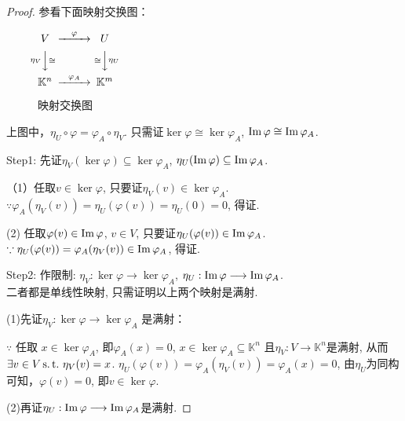 \begin{proof}
  参看下面映射交换图：%
  \begin{figure}[!ht]\centering
      $\begin{CD}
      V @>{\varphi}>> U \\
      @V{\eta_V}V{\cong}V @V{\cong}V{\eta_U}V\\
      \mathbb{K}^n @>{\varphi_A} >> \mathbb{K}^m
    \end{CD}$
    \caption{映射交换图\label{fig:ImKer1}}
  \end{figure}    
  上图中，$\eta_U\circ\varphi = \varphi_A\circ\eta_V$.
  只需证$ \ker\varphi \cong \ker\varphi_A$, $ \operatorname{Im}\varphi \cong \operatorname{Im}\varphi_A $.

  Step1: 先证$ \eta_V(\ker\varphi) \subseteq \ker\varphi_A $,
  $ \eta_U(\operatorname{Im}\varphi) \subseteq \operatorname{Im}\varphi_A $.

  （1）任取$ v\in \ker\varphi$, 只要证$\eta_V(v) \in \ker\varphi_A$.\\ 
  $ \because \varphi_A(\eta_V(v)) = \eta_U(\varphi(v)) = \eta_U(0) = 0 $, 得证.

  (2) 任取$ \varphi(v) \in \operatorname{Im}\varphi $, $ v \in V $,
  只要证$ \eta_U(\varphi(v)) \in \operatorname{Im}\varphi_A$.\\
  $ \because \eta_U(\varphi(v)) = \varphi_A(\eta_V(v)) \in \operatorname{Im}\varphi_A $, 得证.

  Step2: 作限制:  
  $ \eta_V: \ker\varphi \longrightarrow \ker\varphi_A $, 
  $ \eta_U: \operatorname{Im}\varphi \longrightarrow \operatorname{Im}\varphi_A $.\\
  二者都是单线性映射, 只需证明以上两个映射是满射.

  (1)先证$ \eta_V: \ker\varphi \longrightarrow \ker\varphi_A $
  是满射：

  $ \because $ 任取 $ x \in \ker\varphi_A $, 即$ \varphi_A(x) = 0 $,
  $ x \in \ker\varphi_A \subseteq \mathbb{K}^n $
  且$ \eta_V: V \longrightarrow \mathbb{K}^n $是满射,
  从而$ \exists v \in V \operatorname{s.t.{}} \eta_V(v) = x $.
  $\eta_U(\varphi(v)) = \varphi_A(\eta_V(v)) = \varphi_A(x) = 0 $,
  由$ \eta_U $为同构可知，$\varphi(v) = 0 $, 即$ v \in \ker\varphi $.

  (2)再证$ \eta_U: \operatorname{Im}\varphi \longrightarrow \operatorname{Im}\varphi_A $是满射.
  

\end{proof}
